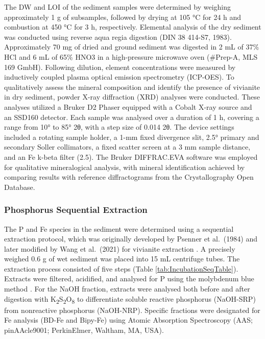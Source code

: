 \documentclass[12pt,twoside]{book}
\begin{document}
The DW and LOI of the sediment samples were determined by weighing approximately 1 g of subsamples, followed by drying at 105 °C for 24 h and combustion at 450 °C for 3 h, respectively. Elemental analysis of the dry sediment was conducted using reverse aqua regia digestion (DIN 38 414-S7, 1983). Approximately 70 mg of dried and ground sediment was digested in 2 mL of 37\% HCl and 6 mL of 65\% HNO3 in a high-pressure microwave oven (\#Prep-A, MLS 169 GmbH). Following dilution, element concentrations were measured by inductively coupled plasma optical emission spectrometry (ICP-OES).
To qualitatively assess the mineral composition and identify the presence of vivianite in dry sediment, powder X-ray diffraction (XRD) analyses were conducted. These analyses utilized a Bruker D2 Phaser equipped with a Cobalt X-ray source and an SSD160 detector. Each sample was analysed over a duration of 1 h, covering a range from 10° to 85° 2θ, with a step size of 0.014 2θ. The device settings included a rotating sample holder, a 1-mm fixed divergence slit, 2.5° primary and secondary Soller collimators, a fixed scatter screen at a 3 mm sample distance, and an Fe k-beta filter (2.5). The Bruker DIFFRAC.EVA software was employed for qualitative mineralogical analysis, with mineral identification achieved by comparing results with reference diffractograms from the Crystallography Open Database.

\subsubsection{Phosphorus Sequential Extraction}\label{phosphorus-sequential-extraction}

The P and Fe species in the sediment were determined using a sequential extraction protocol, which was originally developed by Psenner et al.~(1984) and later modified by Wang et al.~(2021) for vivianite extraction \citep{Psenner1984, Wang2021}. A precisely weighed 0.6 g of wet sediment was placed into 15 mL centrifuge tubes. The extraction process consisted of five steps (Table \ref{tab:IncubationSeqTable}). Extracts were filtered, acidified, and analysed for P using the molybdenum blue method \citep{Murphy1962}. For the NaOH fraction, extracts were analysed both before and after digestion with K\textsubscript{2}S\textsubscript{2}O\textsubscript{8} to differentiate soluble reactive phosphorus (NaOH-SRP) from nonreactive phosphorus (NaOH-NRP). Specific fractions were designated for Fe analysis (BD-Fe and Bipy-Fe) using Atomic Absorption Spectroscopy (AAS; pinAAcle9001; PerkinElmer, Waltham, MA, USA).
\end{document}
